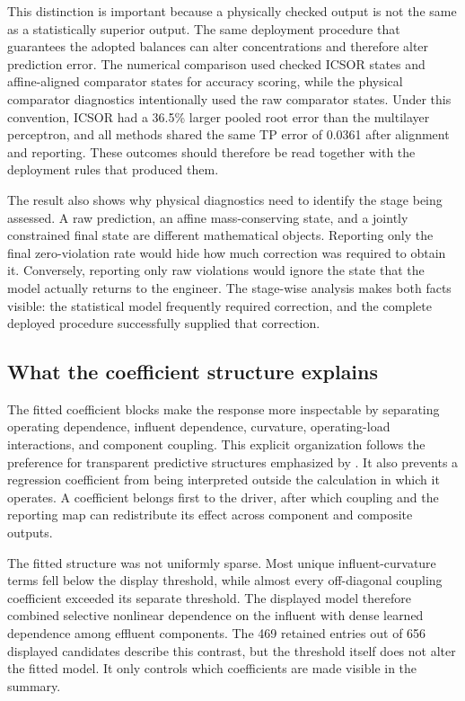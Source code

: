 This distinction is important because a physically checked output is not the same as a statistically superior output. The same deployment procedure that guarantees the adopted balances can alter concentrations and therefore alter prediction error. The numerical comparison used checked ICSOR states and affine-aligned comparator states for accuracy scoring, while the physical comparator diagnostics intentionally used the raw comparator states. Under this convention, ICSOR had a 36.5\% larger pooled root error than the multilayer perceptron, and all methods shared the same TP error of 0.0361 after alignment and reporting. These outcomes should therefore be read together with the deployment rules that produced them.

The result also shows why physical diagnostics need to identify the stage being assessed. A raw prediction, an affine mass-conserving state, and a jointly constrained final state are different mathematical objects. Reporting only the final zero-violation rate would hide how much correction was required to obtain it. Conversely, reporting only raw violations would ignore the state that the model actually returns to the engineer. The stage-wise analysis makes both facts visible: the statistical model frequently required correction, and the complete deployed procedure successfully supplied that correction.

\subsection{What the coefficient structure explains}

The fitted coefficient blocks make the response more inspectable by separating operating dependence, influent dependence, curvature, operating-load interactions, and component coupling. This explicit organization follows the preference for transparent predictive structures emphasized by \citet{Rudin2019}. It also prevents a regression coefficient from being interpreted outside the calculation in which it operates. A coefficient belongs first to the driver, after which coupling and the reporting map can redistribute its effect across component and composite outputs.

The fitted structure was not uniformly sparse. Most unique influent-curvature terms fell below the display threshold, while almost every off-diagonal coupling coefficient exceeded its separate threshold. The displayed model therefore combined selective nonlinear dependence on the influent with dense learned dependence among effluent components. The 469 retained entries out of 656 displayed candidates describe this contrast, but the threshold itself does not alter the fitted model. It only controls which coefficients are made visible in the summary.


